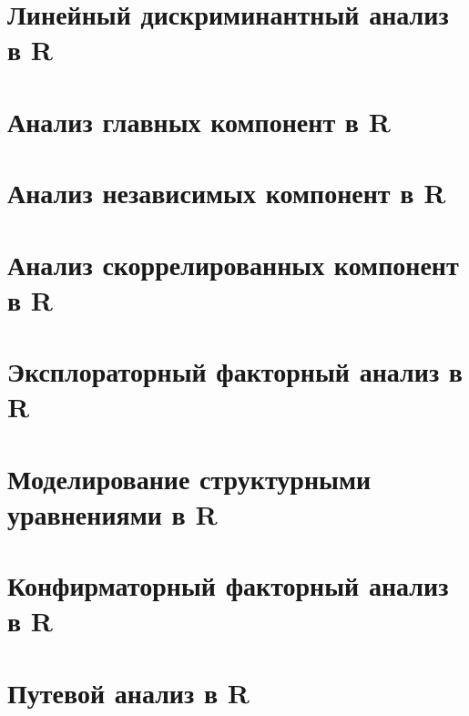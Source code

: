 \documentclass[
  letterpaper,
]{scrbook}
\theoremstyle{definition}
\theoremstyle{remark}
\begin{document}

\chapter{Линейный дискриминантный анализ в R}\label{randan-lda}


\chapter{Анализ главных компонент в R}\label{randan-pca}


\chapter{Анализ независимых компонент в R}\label{randan-ica}


\chapter{Анализ скоррелированных компонент в R}\label{randan-cca}


\chapter{Эксплораторный факторный анализ в R}\label{randan-efa}


\chapter{Моделирование структурными уравнениями в R}\label{randan-sem}


\chapter{Конфирматорный факторный анализ в R}\label{randan-cfa}


\chapter{Путевой анализ в R}\label{randan-path}
\end{document}
